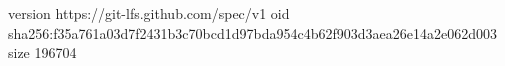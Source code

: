 version https://git-lfs.github.com/spec/v1
oid sha256:f35a761a03d7f2431b3c70bcd1d97bda954c4b62f903d3aea26e14a2e062d003
size 196704
